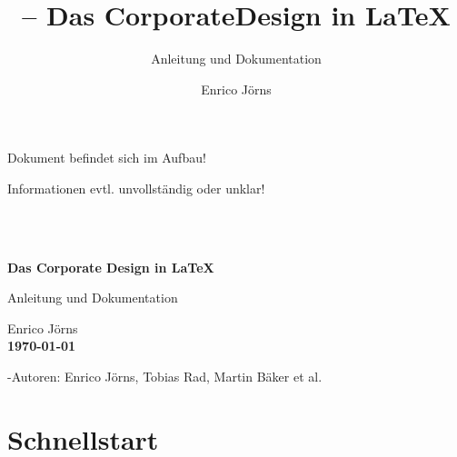 \documentclass[%
  a4paper,%
  11pt,%
  twoside=false,%
  rgb,%
  extramargin,%
  parskip=half,%
]{tubsbook}
\title{\tubslatex -- Das CorporateDesign in \LaTeX}
\subtitle{Anleitung und Dokumentation}
\author{Enrico Jörns}
\begin{document}



\pagestyle{empty}
\hfill
\begin{center}
\huge\color{tuRed}
Dokument befindet sich im Aufbau!\bigskip

Informationen evtl. unvollständig oder unklar!
\end{center}
\vspace*{3cm}
\begin{center}
\LARGE\tubslatexVersion
\end{center}

\newpage~\newpage

\begin{titlepage}
  \showtubslogo
  \showtopline
  \begin{segment}{2}
    \centering
    \Huge \tubslatex\\[\medskipamount]
    \bfseries\huge Das Corporate Design in \LaTeX
  \end{segment}
  \begin{segment}{1}
    \centering
    \LARGE Anleitung und Dokumentation
  \end{segment}
  \begin{segment}{2}
    \centering
    \Large Enrico Jörns\\[\bigskipamount]
    \bfseries\today
  \end{segment}
  \begin{segment}{3}
    \Large \tubslatex-Autoren: Enrico Jörns, Tobias Rad, Martin Bäker et al.
  \end{segment}
\end{titlepage}



\pagestyle{scrheadings}%

\tableofcontents


\newcommand{\newdocumentclass}[1]{\textcolor{tuRed}{\lstinline{#1}}}
\newcommand{\newpackage}[1]{\textcolor{tuRed}{\lstinline{#1}}}



\chapter{Schnellstart}\label{chap:rapid}

\end{document}
